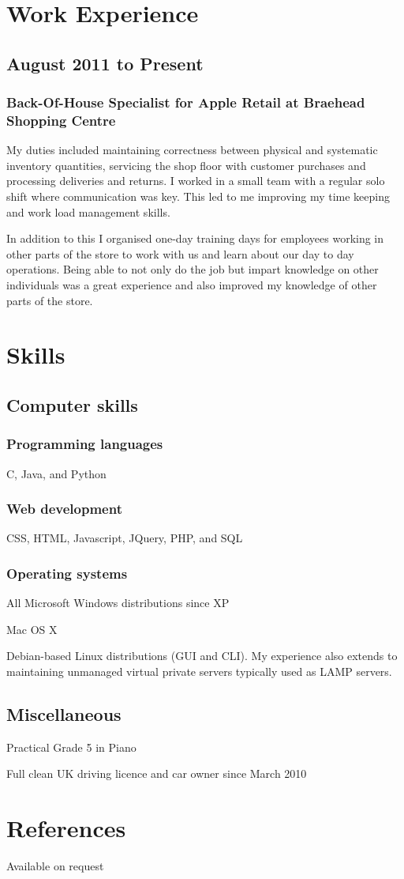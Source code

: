 \documentclass[10pt,a4paper]{article}
\begin{document}
\section*{Work Experience}
\subsection*{August 2011 to Present}
\subsubsection*{Back-Of-House Specialist for Apple Retail at Braehead 
Shopping Centre}
My duties included maintaining correctness between physical and systematic 
inventory quantities, servicing the shop floor with customer purchases and 
processing deliveries and returns. I worked in a small team with a regular 
solo shift where communication was key. This led to me improving my time 
keeping and work load management skills.

In addition to this I organised one-day training days for employees working in 
other parts of the store to work with us and learn about our day to day 
operations. Being able to not only do the job but impart knowledge on other 
individuals was a great experience and also improved my knowledge of other 
parts of the store.
\section*{Skills}
\subsection*{Computer skills}
\subsubsection*{Programming languages}
C, Java, and Python
\subsubsection*{Web development}
CSS, HTML, Javascript, JQuery, PHP, and SQL
\subsubsection*{Operating systems}
All Microsoft Windows distributions since XP

Mac OS X

Debian-based Linux distributions (GUI and CLI). My experience also extends to 
maintaining unmanaged virtual private servers typically used as LAMP servers.
\subsection*{Miscellaneous}
Practical Grade 5 in Piano

Full clean UK driving licence and car owner since March 2010
\section*{References}
Available on request
\end{document}
